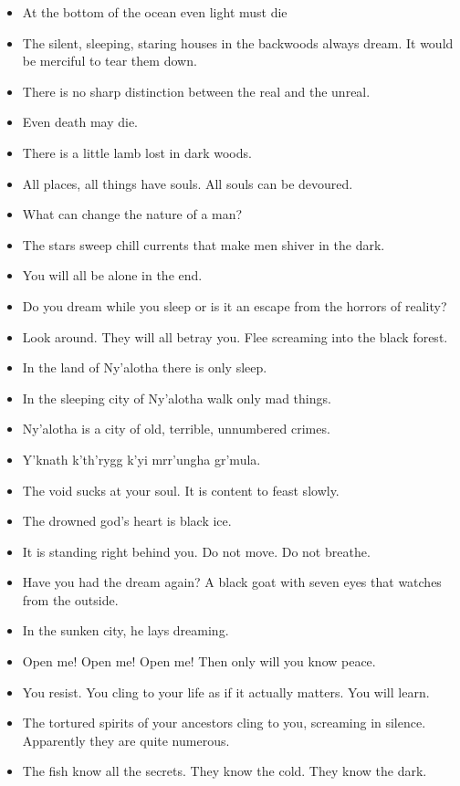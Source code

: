 \begin{multicols}{2}
	\begin{itemize}
		\item At the bottom of the ocean even light must die
		\item The silent, sleeping, staring houses in the backwoods always dream. It would be merciful to tear them down.
		\item There is no sharp distinction between the real and the unreal.
		\item Even death may die.
		\item There is a little lamb lost in dark woods.
		\item All places, all things have souls. All souls can be devoured.
		\item What can change the nature of a man?
		\item The stars sweep chill currents that make men shiver in the dark.
		\item You will all be alone in the end.
		\item Do you dream while you sleep or is it an escape from the horrors of reality?
		\item Look around. They will all betray you. Flee screaming into the black forest.
		\item In the land of Ny'alotha there is only sleep.
		\item In the sleeping city of Ny'alotha walk only mad things.
		\item Ny'alotha is a city of old, terrible, unnumbered crimes.
		\item Y'knath k'th'rygg k'yi mrr'ungha gr'mula.
		\item The void sucks at your soul. It is content to feast slowly.
		\item The drowned god's heart is black ice.
		\item It is standing right behind you. Do not move. Do not breathe.
		\item Have you had the dream again? A black goat with seven eyes that watches from the outside.
		\item In the sunken city, he lays dreaming.
		\item Open me! Open me! Open me! Then only will you know peace.
		\item You resist. You cling to your life as if it actually matters. You will learn.
		\item The tortured spirits of your ancestors cling to you, screaming in silence. Apparently they are quite numerous.
		\item The fish know all the secrets. They know the cold. They know the dark.

\end{itemize}
\end{multicols}
